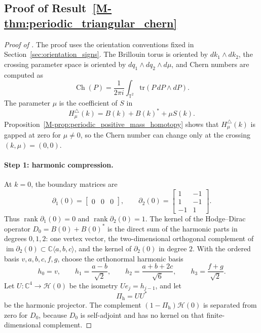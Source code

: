 \documentclass[11pt]{article}
\numberwithin{equation}{section}
\theoremstyle{definition}
\theoremstyle{remark}
\newcommand{\tr}{\mathrm{tr}}
\newcommand{\Ch}{\operatorname{Ch}}
\begin{document}
\subsection{Proof of Result~\ref{M-thm:periodic_triangular_chern}}\label{app:proof:thm:periodic_triangular_chern}
\begin{proof}[Proof of ]
The proof uses the orientation conventions fixed in Section~\ref{sec:orientation_signs}. The
Brillouin torus is oriented by \(dk_1\wedge dk_2\), the crossing parameter space is oriented by
\(dq_1\wedge dq_2\wedge d\mu\), and Chern numbers are computed as
\[
\Ch(P)=\frac{1}{2\pi i}\int_{\mathbb T^2}\tr(P\,dP\wedge dP).
\]
The parameter \(\mu\) is the coefficient of \(S\) in
\[
H_\mu^\triangle(k)=B(k)+B(k)^*+\mu S(k).
\]
Proposition~\ref{M-prop:periodic_positive_mass_homotopy} shows that \(H_\mu^\triangle(k)\) is
gapped at zero for \(\mu\ne0\), so the Chern number can change only at the crossing
\((k,\mu)=(0,0)\).

\paragraph{Step 1: harmonic compression.}
At \(k=0\), the boundary matrices are
\[
\partial_1(0)=\begin{bmatrix}0&0&0\end{bmatrix},\qquad
\partial_2(0)=\begin{bmatrix}1&-1\\1&-1\\-1&1\end{bmatrix}.
\]
Thus \(\operatorname{rank}\partial_1(0)=0\) and \(\operatorname{rank}\partial_2(0)=1\). The
kernel of the Hodge--Dirac operator \(D_0=B(0)+B(0)^*\) is the direct sum of the harmonic parts in
degrees \(0,1,2\): one vertex vector, the two-dimensional orthogonal complement of
\(\operatorname{im}\partial_2(0)\subset\mathbb C\langle a,b,c\rangle\), and the kernel of
\(\partial_2(0)\) in degree \(2\). With the ordered basis
\(v,a,b,c,f,g\), choose the orthonormal harmonic basis
\[
h_0=v,\qquad
h_1=\frac{a-b}{\sqrt2},\qquad
h_2=\frac{a+b+2c}{\sqrt6},\qquad
h_3=\frac{f+g}{\sqrt2}.
\]
Let \(U:\mathbb C^4\to\mathcal H(0)\) be the isometry \(Ue_j=h_{j-1}\), and let
\[
\Pi_{\mathrm h}=UU^*
\]
be the harmonic projector. The complement \((1-\Pi_{\mathrm h})\mathcal H(0)\) is separated from
zero for \(D_0\), because \(D_0\) is self-adjoint and has no kernel on that finite-dimensional
complement.


\end{proof}
\end{document}
